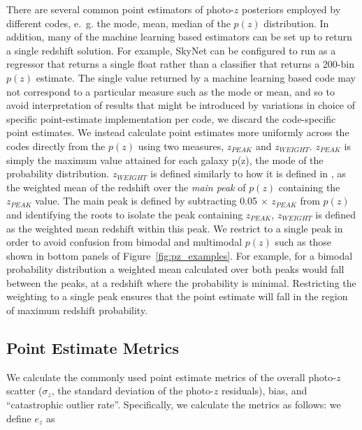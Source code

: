 There are several common point estimators of photo-$z$ posteriors employed by different codes, e.~g. the mode, mean, median of the $p(z)$ distribution.  In addition, many of the machine learning based estimators can be set up to return a single redshift solution.  For example, SkyNet can be configured to run as a regressor that returns a single float rather than a classifier that returns a 200-bin $p(z)$ estimate.  The single value returned by a machine learning based code may not correspond to a particular measure such as the mode or mean, and so to avoid interpretation of results that might be introduced by variations in choice of specific point-estimate implementation per code, we discard the code-specific point estimates. We instead calculate point estimates more uniformly across the codes directly from the $p(z)$ using two measures, $z_{PEAK}$ and $z_{WEIGHT}$.  $z_{PEAK}$  is simply the maximum value attained for each galaxy p(z), the mode of the probability distribution.  $z_{WEIGHT}$ is defined similarly to how it is defined in \citet{Dahlen:13}, as the weighted mean of the redshift over the {\it main peak} of $p(z)$ containing the $z_{PEAK}$ value.  The main peak is defined by subtracting 0.05$\,\times\,z_{PEAK}$ from $p(z)$ and identifying the roots to isolate the peak containing $z_{PEAK}$, $z_{WEIGHT}$ is defined as the weighted mean redshift within this peak.  We restrict to a single peak in order to avoid confusion from bimodal and multimodal $p(z)$ such as those shown in bottom panels of Figure~\ref{fig:pz_examples}.  For example, for a bimodal probability distribution a weighted mean calculated over both peaks would fall between the peaks, at a redshift where the probability is minimal. Restricting the weighting to a single peak ensures that the point estimate will fall in the region of maximum redshift probability. %

\subsection{Point Estimate Metrics}
\label{sec:point_metrics}
We calculate the commonly used point estimate metrics of the overall photo-$z$ scatter ($\sigma_{z}$, the standard deviation of the photo-$z$ residuals), bias, and ``catastrophic outlier rate''.  Specifically, we calculate the metrics as follows:
we define $e_{z}$ as

